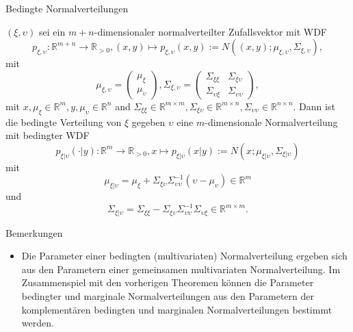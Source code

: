 \documentclass[
  8pt,
  ignorenonframetext,
]{beamer}
\providecommand{\tightlist}{%
  \setlength{\itemsep}{0pt}\setlength{\parskip}{0pt}}
\newcommand{\ups}{\upsilon}
\begin{document}
\begin{frame}{Bedingte Normalverteilungen}
\protect\hypertarget{bedingte-normalverteilungen}{}
\footnotesize
\begin{theorem}
\justifying
\normalfont
$(\xi,\ups)$ sei ein $m+n$-dimensionaler normalverteilter Zufallsvektor mit WDF
\begin{equation}
p_{\xi,\ups} : \mathbb{R}^{m + n} \to \mathbb{R}_{>0}, (x,y) \mapsto
p_{\xi,\ups}(x,y) := N\left((x,y); \mu_{\xi,\ups}, \Sigma_{\xi,\ups}\right),
\end{equation}
mit
\begin{equation}
\mu_{\xi,\ups} = \left(\begin{matrix} \mu_\xi \\ \mu_\ups \end{matrix} \right),
\Sigma_{\xi,\ups} = \left(\begin{matrix} \Sigma_{\xi\xi} & \Sigma_{\xi\ups} \\ \Sigma_{\ups\xi} & \Sigma_{\ups\ups} \end{matrix} \right),
\end{equation}
mit $x,\mu_\xi \in \mathbb{R}^m, y,\mu_\ups\in\mathbb{R}^n$ and  $\Sigma_{\xi\xi} \in \mathbb{R}^{m\times m}, \Sigma_{\xi\ups} \in \mathbb{R}^{m\times n}, \Sigma_{\ups\ups} \in \mathbb{R}^{n \times n}$. Dann ist die
bedingte Verteilung von $\xi$ gegeben $\ups$ eine $m$-dimensionale Normalverteilung
mit bedingter WDF
\begin{equation}
p_{\xi|\ups}(\cdot|y) : \mathbb{R}^m \to \mathbb{R}_{>0}, x \mapsto p_{\xi|\ups}(x|y) :=
N(x;\mu_{\xi|\ups},\Sigma_{\xi|\ups})
\end{equation}
mit
\begin{equation}\label{eq:gauss_cond_exp}
\mu_{\xi|\ups} = \mu_\xi  + \Sigma_{\xi\ups}\Sigma_{\ups\ups}^{-1}(\ups-\mu_\ups) \in \mathbb{R}^m
\end{equation}
und
\begin{equation}\label{eq:gauss_cond_var}
\Sigma_{\xi|\ups} = \Sigma_{\xi\xi}  - \Sigma_{\xi\ups}\Sigma_{\ups\ups}^{-1}\Sigma_{\ups\xi} \in \mathbb{R}^{m\times m}.
\end{equation}
\end{theorem}

Bemerkungen

\begin{itemize}
\tightlist
\item
  Die Parameter einer bedingten (multivariaten) Normalverteilung ergeben
  sich aus den Parametern einer gemeinsamen multivariaten
  Normalverteilung. Im Zusammenspiel mit den vorherigen Theoremen können
  die Parameter bedingter und marginale Normalverteilungen aus den
  Parametern der komplementären bedingten und marginalen
  Normalverteilungen bestimmt werden.
\end{itemize}
\end{frame}
\end{document}
